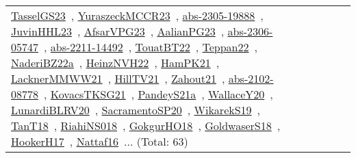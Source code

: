 {\begin{longtable}{lp{3cm}>{\raggedright\arraybackslash}p{6cm}>{\raggedright\arraybackslash}p{6cm}>{\raggedright\arraybackslash}p{8cm}}
\href{../works/TasselGS23.pdf}{TasselGS23}~\cite{TasselGS23}, \href{../works/YuraszeckMCCR23.pdf}{YuraszeckMCCR23}~\cite{YuraszeckMCCR23}, \href{../works/abs-2305-19888.pdf}{abs-2305-19888}~\cite{abs-2305-19888}, \href{../works/JuvinHHL23.pdf}{JuvinHHL23}~\cite{JuvinHHL23}, \href{../works/AfsarVPG23.pdf}{AfsarVPG23}~\cite{AfsarVPG23}, \href{../works/AalianPG23.pdf}{AalianPG23}~\cite{AalianPG23}, \href{../works/abs-2306-05747.pdf}{abs-2306-05747}~\cite{abs-2306-05747}, \href{../works/abs-2211-14492.pdf}{abs-2211-14492}~\cite{abs-2211-14492}, \href{../works/TouatBT22.pdf}{TouatBT22}~\cite{TouatBT22}, \href{../works/Teppan22.pdf}{Teppan22}~\cite{Teppan22}, \href{../works/NaderiBZ22a.pdf}{NaderiBZ22a}~\cite{NaderiBZ22a}, \href{../works/HeinzNVH22.pdf}{HeinzNVH22}~\cite{HeinzNVH22}, \href{../works/HamPK21.pdf}{HamPK21}~\cite{HamPK21}, \href{../works/LacknerMMWW21.pdf}{LacknerMMWW21}~\cite{LacknerMMWW21}, \href{../works/HillTV21.pdf}{HillTV21}~\cite{HillTV21}, \href{../works/Zahout21.pdf}{Zahout21}~\cite{Zahout21}, \href{../works/abs-2102-08778.pdf}{abs-2102-08778}~\cite{abs-2102-08778}, \href{../works/KovacsTKSG21.pdf}{KovacsTKSG21}~\cite{KovacsTKSG21}, \href{../works/PandeyS21a.pdf}{PandeyS21a}~\cite{PandeyS21a}, \href{../works/WallaceY20.pdf}{WallaceY20}~\cite{WallaceY20}, \href{../works/LunardiBLRV20.pdf}{LunardiBLRV20}~\cite{LunardiBLRV20}, \href{../works/SacramentoSP20.pdf}{SacramentoSP20}~\cite{SacramentoSP20}, \href{../works/WikarekS19.pdf}{WikarekS19}~\cite{WikarekS19}, \href{../works/TanT18.pdf}{TanT18}~\cite{TanT18}, \href{../works/RiahiNS018.pdf}{RiahiNS018}~\cite{RiahiNS018}, \href{../works/GokgurHO18.pdf}{GokgurHO18}~\cite{GokgurHO18}, \href{../works/GoldwaserS18.pdf}{GoldwaserS18}~\cite{GoldwaserS18}, \href{../works/HookerH17.pdf}{HookerH17}~\cite{HookerH17}, \href{../works/Nattaf16.pdf}{Nattaf16}~\cite{Nattaf16}... (Total: 63)\\

\end{longtable}}
